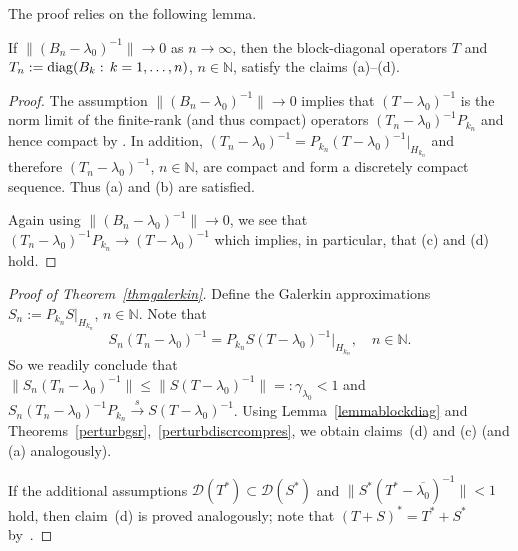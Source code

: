 \documentclass[a4paper,reqno]{amsart}
\begin{document}
The proof relies on the following lemma.

\begin{lemma}\label{lemmablockdiag}
If $\|(B_n-\lambda_0)^{-1}\|\to 0$ as $n\to\infty$, then the block-diagonal operators $T$ and $T_n:={\rm diag}(B_k:\,k=1,\dots,n)$, $n\in{\mathbb{N}}$, satisfy the claims  {\rm (a)--(d)}.
\end{lemma}

\begin{proof}
The assumption $\|(B_n-\lambda_0)^{-1}\|\to 0$ implies that $(T-\lambda_0)^{-1}$ is the norm limit of the finite-rank (and thus compact) operators $(T_n-\lambda_0)^{-1}P_{k_n}$ and hence compact by \cite[Theorem III.4.7]{kato}.
In addition, $(T_n-\lambda_0)^{-1}=P_{k_n}(T-\lambda_0)^{-1}|_{H_{k_n}}$ and therefore $(T_n-\lambda_0)^{-1}$, $n\in{\mathbb{N}}$, are compact and form a discretely compact sequence.
Thus (a) and (b) are satisfied. 

Again using $\|(B_n-\lambda_0)^{-1}\|\to 0$, we see that $(T_n-\lambda_0)^{-1}P_{k_n}\to (T-\lambda_0)^{-1}$ which implies, in particular, that (c) and (d) hold.
\end{proof}

\begin{proof}[Proof of Theorem~{\rm\ref{thmgalerkin}}]
Define the Galerkin approximations $S_n:=P_{k_n}S|_{H_{k_n}}$, $n\in{\mathbb{N}}$.
Note that $$S_n(T_n-\lambda_0)^{-1}=P_{k_n}S(T-\lambda_0)^{-1}|_{H_{k_n}},\quad n\in{\mathbb{N}}.$$
So we readily conclude that $\|S_n(T_n-\lambda_0)^{-1}\|\leq \|S(T-\lambda_0)^{-1}\|=:\gamma_{\lambda_0}<1$ and $S_n(T_n-\lambda_0)^{-1}P_{k_n}{\stackrel{s}{\rightarrow}} S(T-\lambda_0)^{-1}$.
Using Lemma~\ref{lemmablockdiag} and 
Theorems~\ref{perturbgsr},~\ref{perturbdiscrcompres}, we obtain claims~(d) and (c)  (and (a) analogously).

If the additional assumptions ${\mathcal D}(T^*)\subset{\mathcal D}(S^*)$ and $\|S^*(T^*-\overline{\lambda_0})^{-1}\|<1$ hold, then claim~(d) is proved analogously; note that $(T+S)^*=T^*+S^*$ by~\cite[Corollary~1]{Hess-Kato}.
\end{proof}
\end{document}
